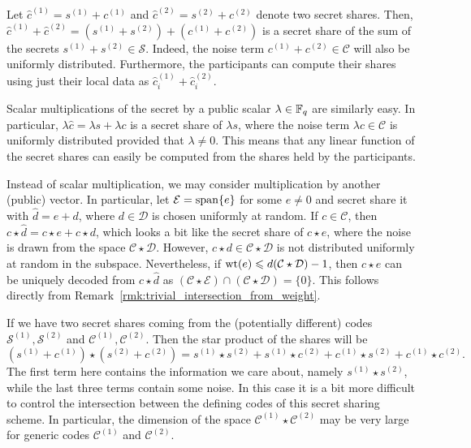 \documentclass[../main.tex]{subfiles}
\begin{document}
Let $\hat{c}^{(1)} = s^{(1)} + c^{(1)}$ and $\hat{c}^{(2)} = s^{(2)} + c^{(2)}$ denote two secret shares. Then, $\hat{c}^{(1)} + \hat{c}^{(2)} = (s^{(1)} + s^{(2)}) + (c^{(1)} + c^{(2)})$ is a secret share of the sum of the secrets $s^{(1)} + s^{(2)} \in \mathcal{S}$. Indeed, the noise term $c^{(1)} + c^{(2)} \in \mathcal{C}$ will also be uniformly distributed. Furthermore, the participants can compute their shares using just their local data as $\hat{c}^{(1)}_i + \hat{c}^{(2)}_i$.

Scalar multiplications of the secret by a public scalar $\lambda \in \mathbb{F}_q$ are similarly easy. In particular, $\lambda \hat{c} = \lambda s + \lambda c$ is a secret share of $\lambda s$, where the noise term $\lambda c \in \mathcal{C}$ is uniformly distributed provided that $\lambda \neq 0$. This means that any linear function of the secret shares can easily be computed from the shares held by the participants.

Instead of scalar multiplication, we may consider multiplication by another (public) vector. In particular, let $\mathcal{E} = \operatorname{span}\{e\}$ for some $e \neq 0$ and secret share it with $\hat{d} = e + d$, where $d \in \mathcal{D}$ is chosen uniformly at random. If $c \in \mathcal{C}$, then $c \star \hat{d} = c \star e + c \star d$, which looks a bit like the secret share of $c \star e$, where the noise is drawn from the space $\mathcal{C} \star \mathcal{D}$. However, $c \star d \in \mathcal{C} \star \mathcal{D}$ is not distributed uniformly at random in the subspace. Nevertheless, if $\operatorname{wt}(e) \leqslant d(\mathcal{C} \star \mathcal{D}) - 1$, then $c \star e$ can be uniquely decoded from $c \star \hat{d}$ as $(\mathcal{C} \star \mathcal{E}) \cap (\mathcal{C} \star \mathcal{D}) = \{0\}$. This follows directly from Remark~\ref{rmk:trivial_intersection_from_weight}.

If we have two secret shares coming from the (potentially different) codes $\mathcal{S}^{(1)}, \mathcal{S}^{(2)}$ and $\mathcal{C}^{(1)}, \mathcal{C}^{(2)}$. Then the star product of the shares will be
\begin{equation*}
    (s^{(1)} + c^{(1)}) \star (s^{(2)} + c^{(2)}) = s^{(1)} \star s^{(2)} + s^{(1)} \star c^{(2)} + c^{(1)} \star s^{(2)} + c^{(1)} \star c^{(2)}.
\end{equation*}
The first term here contains the information we care about, namely $s^{(1)} \star s^{(2)}$, while the last three terms contain some noise. In this case it is a bit more difficult to control the intersection between the defining codes of this secret sharing scheme. In particular, the dimension of the space $\mathcal{C}^{(1)} \star \mathcal{C}^{(2)}$ may be very large for generic codes $\mathcal{C}^{(1)}$ and $\mathcal{C}^{(2)}$.
\end{document}
